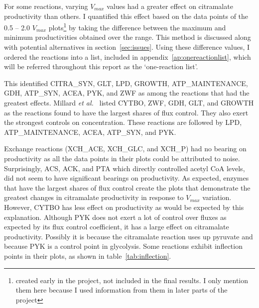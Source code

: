 \documentclass[parskip=full]{scrreprt}
\begin{document}
For some reactions, varying $V_{max}$ values had a greater effect on citramalate productivity than others. I quantified this effect based on the data points of the 0.5 -- 2.0 $V_{max}$ plots\footnote{created early in the project, not included in the final results. I only mention them here because I used information from them in later parts of the project} by taking the difference between the maximum and minimum productivities obtained over the range. This method is discussed along with potential alternatives in section~\ref{sec:issues}. Using these difference values, I ordered the reactions into a list, included in appendix~\ref{ap:onereactionlist}, which will be referred throughout this report as the `one-reaction list'.

This identified CITRA\_SYN, GLT, LPD, GROWTH, ATP\_MAINTENANCE, GDH, ATP\_SYN, ACEA, PYK, and ZWF as among the reactions that had the greatest effects. Millard \emph{et al.}~\cite{millard_metabolic_2017} listed CYTBO, ZWF, GDH, GLT, and GROWTH as the reactions found to have the largest shares of flux control. They also exert the strongest controls on concentration. These reactions are followed by LPD, ATP\_MAINTENANCE, ACEA, ATP\_SYN, and PYK.

Exchange reactions (XCH\_ACE, XCH\_GLC, and XCH\_P) had no bearing on productivity as all the data points in their plots could be attributed to noise. Surprisingly, ACS, ACK, and PTA which directly controlled acetyl CoA levels, did not seem to have significant bearings on productivity. As expected, enzymes that have the largest shares of flux control create the plots that demonstrate the greatest changes in citramalate productivity in response to $V_{max}$ variation. However, CYTBO has less effect on productivity as would be expected by this explanation. Although PYK does not exert a lot of control over fluxes as expected by its flux control coefficient, it has a large effect on citramalate productivity. Possibly it is because the citramalate reaction uses up pyruvate and because PYK is a control point in glycolysis. Some reactions exhibit inflection points in their plots, as shown in table~\ref{tab:inflection}.
\end{document}
